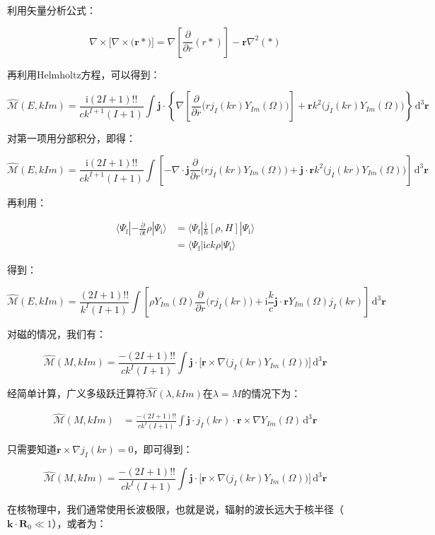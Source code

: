 \begin{booknote*}
利用矢量分析公式：

\[
\nabla\times\bigl[\nabla\times\bigl(\boldsymbol{r}*\bigr)\bigr]=\nabla\left[\frac{\partial}{\partial r}(r*)\right]-\boldsymbol{r}\nabla^{2}(*)
\]

再利用Helmholtz方程，可以得到：

\[
\hat{\mathcal{M}}(E,kIm)=\frac{\mathrm{i}(2I+1)!!}{ck^{I+1}(I+1)}\int\boldsymbol{j}\cdot\left\{ \nabla\left[\frac{\partial}{\partial r}\bigl(rj_{I}(kr)Y_{Im}(\Omega)\bigr)\right]+\boldsymbol{r}k^{2}\bigl(j_{I}(kr)Y_{Im}(\Omega)\bigr)\right\} \,\mathrm{d}^{3}\boldsymbol{r}
\]

对第一项用分部积分，即得：

\[
\hat{\mathcal{M}}(E,kIm)=\frac{\mathrm{i}(2I+1)!!}{ck^{I+1}(I+1)}\int\left[-\nabla\cdot\boldsymbol{j}\frac{\partial}{\partial r}\bigl(rj_{I}(kr)Y_{Im}(\Omega)\bigr)+\boldsymbol{j}\cdot\boldsymbol{r}k^{2}\bigl(j_{I}(kr)Y_{Im}(\Omega)\bigr)\right]\,\mathrm{d}^{3}\boldsymbol{r}
\]

再利用：

\begin{align*}
\langle\Psi_{\text{f}}|-\frac{\partial}{\partial t}\rho|\Psi_{\text{i}}\rangle & =\langle\Psi_{\text{f}}|\frac{\mathrm{i}}{\hbar}[\rho,H]|\Psi_{\text{i}}\rangle\\
 & =\langle\Psi_{\text{f}}|\mathrm{i}ck\rho|\Psi_{\text{i}}\rangle
\end{align*}

得到：

\[
\hat{\mathcal{M}}(E,kIm)=\frac{(2I+1)!!}{k^{I}(I+1)}\int\left[\rho Y_{Im}(\Omega)\frac{\partial}{\partial r}\bigl(rj_{I}(kr)\bigr)+\mathrm{i}\frac{k}{c}\boldsymbol{j}\cdot\boldsymbol{r}Y_{Im}(\Omega)j_{I}(kr)\right]\,\mathrm{d}^{3}\boldsymbol{r}
\]
\end{booknote*}
对磁的情况，我们有：

\begin{equation}
\hat{\mathcal{M}}(M,kIm)=\frac{-(2I+1)!!}{ck^{I}(I+1)}\int\boldsymbol{j}\cdot\bigl[\boldsymbol{r}\times\nabla\bigl(j_{I}(kr)Y_{Im}(\Omega)\bigr)\bigr]\,\mathrm{d}^{3}\boldsymbol{r}
\end{equation}

\begin{booknote*}
经简单计算，广义多级跃迁算符$\hat{\mathcal{M}}(\lambda,kIm)$在$\lambda=M$的情况下为：

\begin{align*}
\hat{\mathcal{M}}(M,kIm) & =\frac{-(2I+1)!!}{ck^{I}(I+1)}\int\boldsymbol{j}\cdot j_{I}(kr)\cdot\boldsymbol{r}\times\nabla Y_{Im}(\Omega)\,\mathrm{d}^{3}\boldsymbol{r}
\end{align*}

只需要知道$\boldsymbol{r}\times\nabla j_{I}(kr)=0$，即可得到：

\[
\hat{\mathcal{M}}(M,kIm)=\frac{-(2I+1)!!}{ck^{I}(I+1)}\int\boldsymbol{j}\cdot\bigl[\boldsymbol{r}\times\nabla\bigl(j_{I}(kr)Y_{Im}(\Omega)\bigr)\bigr]\,\mathrm{d}^{3}\boldsymbol{r}
\]
\end{booknote*}
在核物理中，我们通常使用长波极限，也就是说，辐射的波长远大于核半径（$\boldsymbol{k}\cdot\boldsymbol{R}_{0}\ll1$），或者为：

